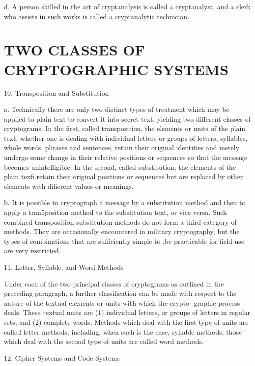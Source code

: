 d. A person skilled in the art of cryptanalysis is called a cryptanalyst,
and a clerk who assists in such works is called a cryptanalytic technician.

\section{TWO CLASSES OF CRYPTOGRAPHIC SYSTEMS}

10. Transposition and Substitution

a. Technically there are only two distinct types of treatment which
may be applied to plain text to convert it into secret text, yielding two
different classes of cryptograms. In the ﬁrst, called transposition, the
elements or units of the plain text, whether one is dealing with individual
letters or groups of letters, syllables, whole words, phrases and sentences,
retain their original identities and merely undergo some change in their
relative positions or sequences so that the message becomes unintelligible.
In the second, called substitution, the elements of the plain texﬁ retain
their original positions or sequences but are replaced by other elements
with diﬁerent values or meanings.

b. It is possible to cryptograph a message by a substitution method
and then to apply a tran5position method to the substitution text, or vice
versa. Such combined transposition-substitution methods do not form a
third category of methods. They are occasionally encountered in military
cryptography, but the types of combinations that are sufﬁciently simple to
,be practicable for ﬁeld use are very restricted.

11. Letter, Syllable, and Word Methods

Under each of the two principal classes of cryptograms as outlined in
the preceding paragraph, a further classiﬁcation can be made with respect
to the nature of the textual elements or units with which the crypto-
graphic process deals. These textual units are (1) individual letters, or
groups of letters in regular sets, and (2) complete words. Methods which
deal with the ﬁrst type of units are called letter methods, including, when
such is the case, syllable methods; those which deal with the second type
of units are called word methods.

12. Cipher Systems and Code Systems

